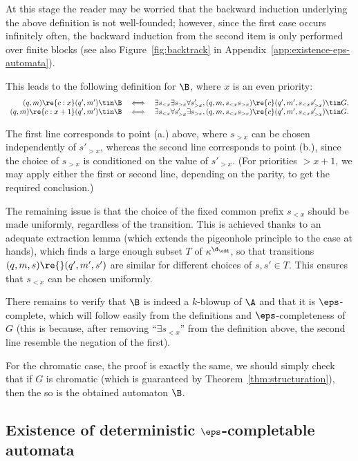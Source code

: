 At this stage the reader may be worried that the backward induction underlying the above definition is not well-founded; however, since the first case occurs infinitely often, the backward induction from the second item is only performed over finite blocks (see also Figure~\ref{fig:backtrack} in Appendix~\ref{app:existence-eps-automata}).

This leads to the following definition for $\B$, where $x$ is an even priority:
\[
    \begin{array}{rcl}
     (q,m) \re{c:x} (q',m') \tin \B  &\iff&  \exists s_{<x} \exists s_{>x} \forall s'_{>x}, (q,m,s_{<x}s_{>x}) \re{c} (q',m',s_{<x} s'_{>x}) \tin G, \\
     (q,m) \re{c:x+1} (q',m') \tin \B  &\iff&  \exists s_{<x} \forall s'_{>x} \exists s_{>x}, (q,m,s_{<x}s_{>x}) \re{c} (q',m',s_{<x} s'_{>x}) \tin G.
    \end{array}
\]

The first line corresponds to point (a.) above, where $s_{>x}$ can be chosen independently of $s'_{>x}$, whereas the second line corresponds to point (b.), since the choice of $s_{>x}$ is conditioned on the value of $s'_{>x}$.
(For priorities $>x+1$, we may apply either the first or second line, depending on the parity, to get the required conclusion.)

The remaining issue is that the choice of the fixed common prefix $s_{<x}$ should be made uniformly, regardless of the transition.
This is achieved thanks to an adequate extraction lemma (which extends the pigeonhole principle to the case at hands), which finds a large enough subset $T$ of $\kappa^{\d_\odd}$, so that transitions $(q,m,s)\re{}(q',m',s')$ are similar for different choices of $s,s' \in T$.
This ensures that $s_{<x}$ can be chosen uniformly.

There remains to verify that $\B$ is indeed a $k$-blowup of $\A$ and that it is $\eps$-complete, which will follow easily from the definitions and $\eps$-completeness of $G$ (this is because, after removing ``$\exists s_{<x}$'' from the definition above, the second line resemble the negation of the first).

For the chromatic case, the proof is exactly the same, we should simply check that if $G$ is chromatic (which is guaranteed by Theorem~\ref{thm:structuration}), then the so is the obtained automaton $\B$.

\subsection{Existence of deterministic $\eps$-completable automata}\label{sec:existence-det-automata}

